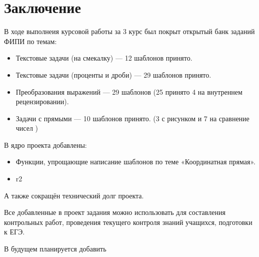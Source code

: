 \section*{Заключение}
В ходе выполнеия курсовой работы за 3 курс был покрыт открытый банк заданий ФИПИ по темам:
		      \begin{itemize}
			      \item Текстовые задачи (на смекалку) — 12 шаблонов принято.
			      \item Текстовые задачи (проценты и дроби) — 29 шаблонов принято.
			      \item Преобразования выражений — 29 шаблонов (25 принято 4 на внутреннем рецензировании).
			      \item Задачи с прямыми — 10 шаблонов принято. (3 с рисунком и 7 на сравнение чисел )
		      \end{itemize}

В ядро проекта добавлены: 
\begin{itemize}
    \item Функции, упрощающие написание шаблонов по теме «Координатная прямая».
    \item r2 %
\end{itemize}

А также сокращён технический долг проекта.

Все добавленные в проект задания можно использовать для составления контрольных работ, проведения текущего контроля знаний учащихся, подготовки к ЕГЭ.~\cite{chas-ege}

В будущем планируется добавить%


